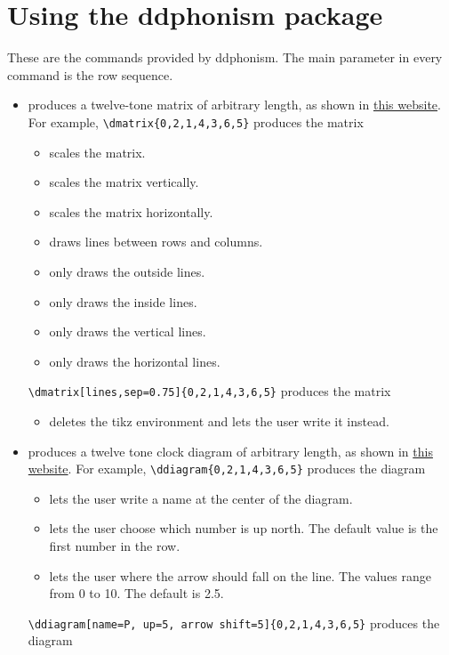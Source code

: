 \documentclass{article}
\begin{document}
	\section{Using the \textsf{ddphonism} package}
	These are the commands provided by \textsf{ddphonism}. The main parameter in every command is the row sequence.
	
	\newcommand{\I}[1]{\item[\texttt{$\backslash$#1}]\quad}	
	\newcommand{\Ii}[1]{\item[\textsf{#1}]\quad}
	\begin{itemize}
		\I{dmatrix} produces a twelve-tone matrix of arbitrary length, as shown in \href{https:matrices.netlify.com}{this website}. For example, \verb|| produces the matrix \dmatrix{0,2,1,4,3,6,5}

		\begin{itemize}
			\Ii{sep} scales the matrix.
			\Ii {vsep} scales the matrix vertically.
			\Ii {hsep} scales the matrix horizontally.
			\Ii{lines} draws lines between rows and columns.
			\Ii{outside lines} only draws the outside lines.
			\Ii{inside lines} only draws the inside lines.
			\Ii{vlines} only draws the vertical lines.
			\Ii{hlines} only draws the horizontal lines.
		\end{itemize}
		\verb|\dmatrix[lines,sep=0.75]{0,2,1,4,3,6,5}| produces the matrix
		
		
		\begin{itemize}
			\Ii{no tikz} deletes the tikz environment and lets the user write it instead.
		\end{itemize}
		
		\I{ddiagram} produces a twelve tone clock diagram of arbitrary length, as shown in \href{https:diagramas.netlify.com}{this website}. For example, \verb|\ddiagram{0,2,1,4,3,6,5}| produces the diagram\\ 
		
		\begin{itemize}
			\Ii{name} lets the user write a name at the center of the diagram.
			\Ii{up} lets the user choose which number is up north. The default value is the first number in the row.
			\Ii{arrow shift} lets the user where the arrow should fall on the line. The values range from 0 to 10. The default is 2.5.
		\end{itemize}
		
		\verb|\ddiagram[name=P, up=5, arrow shift=5]{0,2,1,4,3,6,5}| produces the diagram\\
		

\end{itemize}
\end{document}
